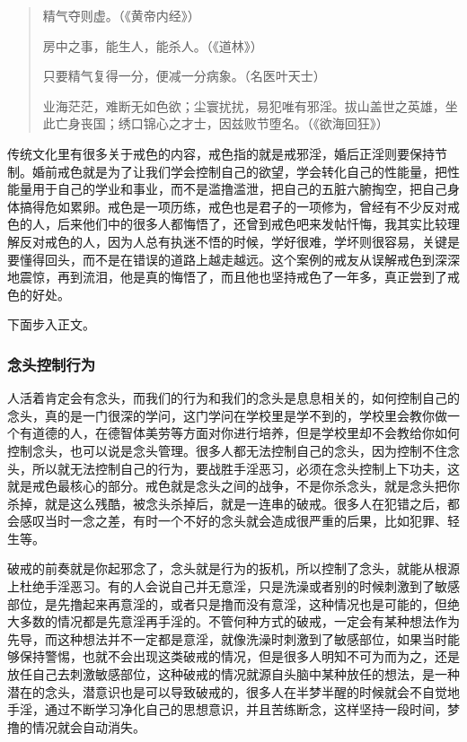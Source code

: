 \begin{case}
\begin{quotation}
        精气夺则虚。（《黄帝内经》）

        房中之事，能生人，能杀人。（《道林》）

        只要精气复得一分，便减一分病象。（名医叶天士）

        业海茫茫，难断无如色欲；尘寰扰扰，易犯唯有邪淫。拔山盖世之英雄，坐此亡身丧国；绣口锦心之才士，因兹败节堕名。（《欲海回狂》）
    \end{quotation}

    传统文化里有很多关于戒色的内容，戒色指的就是戒邪淫，婚后正淫则要保持节制。婚前戒色就是为了让我们学会控制自己的欲望，学会转化自己的性能量，把性能量用于自己的学业和事业，而不是滥撸滥泄，把自己的五脏六腑掏空，把自己身体搞得危如累卵。戒色是一项历练，戒色也是君子的一项修为，曾经有不少反对戒色的人，后来他们中的很多人都悔悟了，还曾到戒色吧来发帖忏悔，我其实比较理解反对戒色的人，因为人总有执迷不悟的时候，学好很难，学坏则很容易，关键是要懂得回头，而不是在错误的道路上越走越远。这个案例的戒友从误解戒色到深深地震惊，再到流泪，他是真的悔悟了，而且他也坚持戒色了一年多，真正尝到了戒色的好处。
\end{case}

下面步入正文。

\subsubsection{念头控制行为}

人活着肯定会有念头，而我们的行为和我们的念头是息息相关的，如何控制自己的念头，真的是一门很深的学问，这门学问在学校里是学不到的，学校里会教你做一个有道德的人，在德智体美劳等方面对你进行培养，但是学校里却不会教给你如何控制念头，也可以说是念头管理。很多人都无法控制自己的念头，因为控制不住念头，所以就无法控制自己的行为，要战胜手淫恶习，必须在念头控制上下功夫，这就是戒色最核心的部分。戒色就是念头之间的战争，不是你杀念头，就是念头把你杀掉，就是这么残酷，被念头杀掉后，就是一连串的破戒。很多人在犯错之后，都会感叹当时一念之差，有时一个不好的念头就会造成很严重的后果，比如犯罪、轻生等。

破戒的前奏就是你起邪念了，念头就是行为的扳机，所以控制了念头，就能从根源上杜绝手淫恶习。有的人会说自己并无意淫，只是洗澡或者别的时候刺激到了敏感部位，是先撸起来再意淫的，或者只是撸而没有意淫，这种情况也是可能的，但绝大多数的情况都是先意淫再手淫的。不管何种方式的破戒，一定会有某种想法作为先导，而这种想法并不一定都是意淫，就像洗澡时刺激到了敏感部位，如果当时能够保持警惕，也就不会出现这类破戒的情况，但是很多人明知不可为而为之，还是放任自己去刺激敏感部位，这种破戒的情况就源自头脑中某种放任的想法，是一种潜在的念头，潜意识也是可以导致破戒的，很多人在半梦半醒的时候就会不自觉地手淫，通过不断学习净化自己的思想意识，并且苦练断念，这样坚持一段时间，梦撸的情况就会自动消失。


